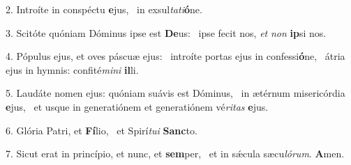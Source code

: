 2. Introíte in conspéctu \textbf{e}jus, \ast\  in exsul\textit{ta}\textit{ti}\textbf{ó}ne.\

3. Scitóte quóniam Dóminus ipse est \textbf{De}us: \ast\  ipse fecit nos, \textit{et} \textit{non} \textbf{ip}si nos.\

4. Pópulus ejus, et oves páscuæ ejus: \dag\  introíte portas ejus in confessi\textbf{ó}ne, \ast\  átria ejus in hymnis: confité\textit{mi}\textit{ni} \textbf{il}li.\

5. Laudáte nomen ejus: quóniam suávis est Dóminus, \dag\  in ætérnum misericórdia \textbf{e}jus, \ast\  et usque in generatiónem et generatiónem vé\textit{ri}\textit{tas} \textbf{e}jus.\

6. Glória Patri, et \textbf{Fí}lio, \ast\  et Spirí\textit{tu}\textit{i} \textbf{Sanc}to.\

7. Sicut erat in princípio, et nunc, et \textbf{sem}per, \ast\  et in sǽcula sæcu\textit{ló}\textit{rum}. \textbf{A}men.\

